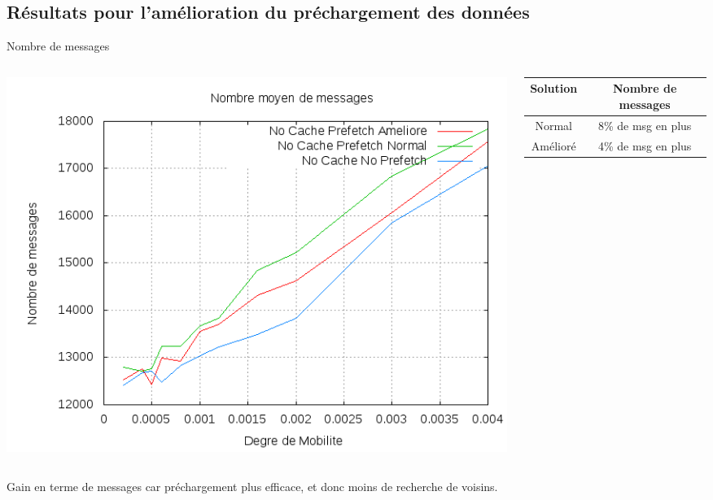 \documentclass{beamer}
\begin{document}
  \subsection{Résultats pour l'amélioration du préchargement des données}
  \begin{frame}
	\begin{center}
	Nombre de messages 
	\end{center}
	\begin{columns}
         \begin{column}{5cm}
          \includegraphics[scale=0.25]{./Ressources/Images/Courbes_Final_Rapport/Nombre_Messages_Prefetchs.png}\\
         \end{column}
         \begin{column}{5cm}
		\begin{table}[!h]
                \begin{center}
                \begin{tabular}{|c|c|}
                \hline
                Solution & Nombre de messages \\
                \hline
                Normal &  8\% de msg en plus\\
                Amélioré &  4\% de msg en plus\\
                \hline
                \end{tabular}
                \end{center}
        \end{table}
         \end{column}
        \end{columns}
	\begin{itemize}\footnotesize{
		\item Gain en terme de messages car préchargement plus efficace, et donc moins de recherche de voisins.
		}
	\end{itemize}
  \end{frame}
	
\end{document}
